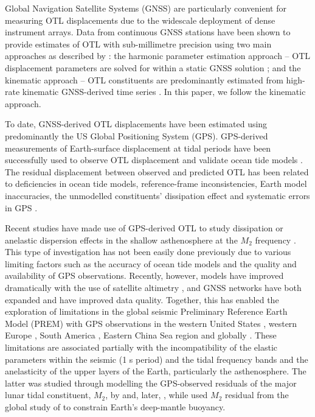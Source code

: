 \documentclass[se, manuscript]{copernicus}
\begin{document}
Global Navigation Satellite Systems (GNSS) are particularly convenient for measuring OTL displacements due to the widescale deployment of dense instrument arrays. Data from continuous GNSS stations have been shown to provide estimates of OTL with sub-millimetre precision using two main approaches as described by \cite{Penna2015}: the harmonic parameter estimation approach – OTL displacement parameters are solved for within a static GNSS solution \citep[e.g.,][]{Schenewerk2001,Allinson2004,King2005,Thomas2006,Yuan2012,Yuan2013}; and the kinematic approach – OTL constituents are predominantly estimated from high-rate kinematic GNSS-derived time series \citep[e.g.,][]{Khan2001,King2006,Penna2015,Martens2016,Wang2019}. In this paper, we follow the kinematic approach.

To date, GNSS-derived OTL displacements have been estimated using predominantly the US Global Positioning System (GPS). GPS-derived measurements of Earth-surface displacement at tidal periods have been successfully used to observe OTL displacement and validate ocean tide models \citep{Urschl2005,King2005}. The residual displacement between observed and predicted OTL has been related to deficiencies in ocean tide models, reference-frame inconsistencies, Earth model inaccuracies, the unmodelled constituents’ dissipation effect and systematic errors in GPS \citep[e.g.,][]{Thomas2006,Ito2011,Yuan2013,Bos2015}.

Recent studies have made use of GPS-derived OTL to study dissipation or anelastic dispersion effects in the shallow asthenosphere at the $M_2$ frequency \citep[e.g.][]{Bos2015}. This type of investigation has not been easily done previously due to various limiting factors such as the accuracy of ocean tide models and the quality and availability of GPS observations. Recently, however, models have improved dramatically with the use of satellite altimetry \citep{Stammer2014}, and GNSS networks have both expanded and have improved data quality. Together, this has enabled the exploration of limitations in the global seismic Preliminary Reference Earth Model (PREM) \citep{Dziewonski1981} with GPS observations in the western United States \citep{Ito2011,Yuan2012}, western Europe \citep{Bos2015}, South America \citep{Martens2016}, Eastern China Sea region \citep{Wang2019} and globally \citep{Yuan2013}. These limitations are associated partially with the incompatibility of the elastic parameters within the seismic (1 s period) and the tidal frequency bands and the anelasticity of the upper layers of the Earth, particularly the asthenosphere. The latter was studied through modelling the GPS-observed residuals of the major lunar tidal constituent, $M_2$, by \cite{Bos2015} and, later, \cite{Wang2019}, while \cite{Lau2017} used $M_2$ residual from the global study of \cite{Yuan2013} to constrain Earth’s deep-mantle buoyancy.
\end{document}
